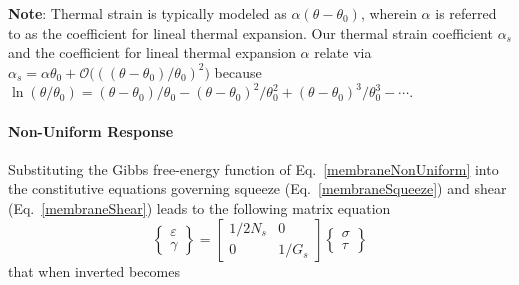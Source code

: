 \textbf{Note}: Thermal strain is typically modeled as $\alpha (\theta - \theta_0)$, wherein $\alpha$ is referred to as the coefficient for lineal thermal expansion.  Our thermal strain coefficient $\alpha_s$ and the coefficient for lineal thermal expansion $\alpha$ relate via $\alpha_s = \alpha \theta_0 + \mathcal{O}\bigl( ((\theta - \theta_0) / \theta_0)^2 \bigr)$ because $\ln ( \theta / \theta_0 ) = (\theta - \theta_0) / \theta_0 - (\theta - \theta_0)^2 / \theta_0^2 + (\theta - \theta_0)^3 / \theta_0^3 - \cdots$.

\paragraph{Non-Uniform Response}

Substituting the Gibbs free-energy function of Eq.~\ref{membraneNonUniform} into the constitutive equations governing squeeze (Eq.~\ref{membraneSqueeze}) and shear (Eq.~\ref{membraneShear}) leads to the following matrix equation
\begin{displaymath}
    \left\{ \begin{matrix}
        \varepsilon \\ \gamma 
    \end{matrix} \right\} = \begin{bmatrix}
        1 / 2 N_s & 0 \\ 0 & 1 / G_s
    \end{bmatrix} \left\{ \begin{matrix}
        \sigma \\ \tau
    \end{matrix} \right\}
\end{displaymath}
that when inverted becomes
